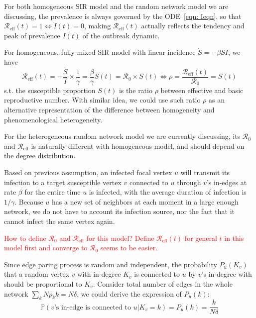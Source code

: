 \documentclass[12pt]{article}
\theoremstyle{plain}
\theoremstyle{definition}
\begin{document}
For both homogeneous SIR model and the random network model we are discussing, the prevalence is always governed by the ODE~\eqref{eqn: Ieqn}, so that $\mathcal{R}_\text{eff}(t)=1 \Leftrightarrow \dot{I}(t)=0$, making $\mathcal{R}_\text{eff}(t)$ actually reflects the tendency and peak of prevalence $I(t)$ of the outbreak dynamic.

For homogeneous, fully mixed SIR model with linear incidence $\dot{S}=-\beta SI$, we have 
\begin{equation}
	\label{eqn: rhoHom}
	\mathcal{R}_\text{eff}(t)=-\frac{\dot{S}}{I}\times \frac{1}{\gamma}=\frac{\beta}{\gamma}S(t)=\mathcal{R}_0\times S(t)
	\Leftrightarrow \rho=\frac{\mathcal{R}_\text{eff}(t)}{\mathcal{R}_0}=S(t)
\end{equation}
s.t. the susceptible proportion $S(t)$ is the ratio $\rho$ between effective and basic reproductive number.
With similar idea, we could use such ratio $\rho$ as an alternative representation of the difference between homogeneity and phenomenological heterogeneity.

For the heterogeneous random network model we are currently discussing, its $\mathcal{R}_0$ and $\mathcal{R}_\text{eff}$ is naturally different with homogeneous model, and should depend on the degree distribution.

Based on previous assumption, an infected focal vertex $u$ will transmit its infection to a target susceptible vertex $v$ connected to $u$ through $v$'s in-edges at rate $\beta$ for the entire time $u$ is infected, with the average duration of infection is $1/\gamma$.
Because $u$ has a new set of neighbors at each moment in a large enough network, we do not have to account its infection source, nor the fact that it cannot infect the same vertex again.

\textcolor{red}{How to define $\mathcal{R}_0$ and $\mathcal{R}_\text{eff}$ for this model?}
\textcolor{red}{Define $\mathcal{R}_\text{eff}(t)$ for general $t$ in this model first and converge to $\mathcal{R}_0$ seems to be easier.}

Since edge paring process is random and independent, the probability $P_u(K_v)$ that a random vertex $v$ with in-degree $K_v$ is connected to $u$ by $v$'s in-degree with should be proportional to $K_v$.
Consider total number of edges in the whole network $\sum_{k}N p_k k=N\delta$, we could derive the expression of $P_u(k)$: 
\begin{equation}
	\mathbb{P}(v \text{'s in-edge is connected to } u|K_v=k)=P_u(k)=\frac{k}{N\delta}
\end{equation}
\end{document}
